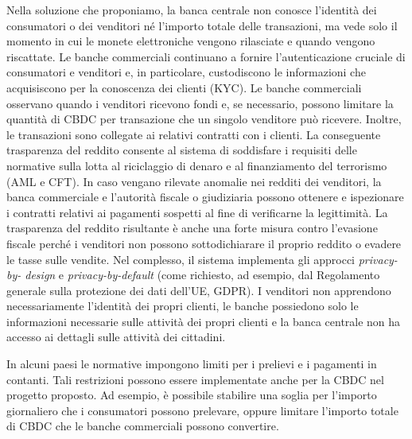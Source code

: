 \documentclass{article}
\begin{document}
Nella soluzione che proponiamo, la banca centrale non conosce  
l'identità dei consumatori o dei venditori né l'importo totale delle 
transazioni, ma vede solo il momento in cui le monete elettroniche vengono 
rilasciate e quando vengono riscattate. Le banche commerciali continuano a 
fornire l'autenticazione cruciale di consumatori e venditori e, in particolare, 
custodiscono le informazioni che acquisiscono per la conoscenza dei clienti 
(KYC). Le banche commerciali osservano quando i venditori ricevono fondi e, se 
necessario, possono limitare la quantità di CBDC per transazione che 
un singolo venditore può ricevere. Inoltre, le transazioni sono 
collegate ai relativi contratti con i clienti. La conseguente 
trasparenza del reddito  consente al sistema di soddisfare i requisiti 
delle normative sulla lotta al riciclaggio di denaro e al 
finanziamento del terrorismo (AML e CFT). In caso vengano rilevate 
anomalie nei redditi dei venditori, la banca commerciale e 
l'autorità fiscale o giudiziaria possono ottenere e ispezionare i 
contratti relativi ai pagamenti sospetti al fine di verificarne la 
legittimità. La trasparenza del reddito risultante è anche una forte 
misura contro l'evasione fiscale perché i venditori non possono 
sottodichiarare il proprio reddito o evadere le tasse sulle vendite. 
Nel complesso, il sistema implementa gli approcci \textit{privacy-by-
design} e \textit{privacy-by-default} (come richiesto, ad esempio, 
dal Regolamento generale sulla protezione dei dati dell'UE, GDPR). I 
venditori non apprendono necessariamente l'identità dei propri clienti, 
le banche possiedono solo le informazioni necessarie sulle attività dei 
propri clienti e la banca centrale non ha accesso ai dettagli sulle 
attività dei cittadini.

In alcuni paesi le normative impongono limiti per i prelievi e i 
pagamenti in contanti. Tali restrizioni possono essere implementate 
anche per la CBDC nel progetto proposto. Ad esempio, è possibile 
stabilire una soglia per l'importo giornaliero che i consumatori possono 
prelevare, oppure limitare l'importo totale di CBDC che le banche 
commerciali possono convertire.
\end{document}
